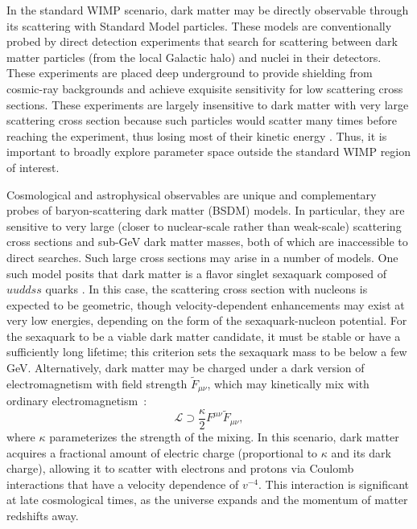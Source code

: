 In the standard WIMP scenario, dark matter may be directly observable through its scattering with Standard Model particles.
These models are conventionally probed by direct detection experiments that search for scattering between dark matter particles (from the local Galactic halo) and nuclei in their detectors.
These experiments are placed deep underground to provide shielding from cosmic-ray backgrounds and achieve exquisite sensitivity for low scattering cross sections. 
These experiments are largely insensitive to dark matter with very large scattering cross section because such particles would scatter many times before reaching the experiment, thus losing most of their kinetic energy \citep[\eg][]{Zaharijas:2004jv}.
Thus, it is important to broadly explore parameter space outside the standard WIMP region of interest.

Cosmological and astrophysical observables are unique and complementary probes of baryon-scattering dark matter (BSDM) models.
In particular, they are sensitive to very large (closer to nuclear-scale rather than weak-scale) scattering cross sections and sub-GeV dark matter masses, both of which are inaccessible to direct searches.
Such large cross sections may arise in a number of models.
One such model posits that dark matter is a flavor singlet sexaquark composed of $uuddss$ quarks \citep{Farrar:2017eqq}.
In this case, the scattering cross section with nucleons is expected to be geometric, though velocity-dependent enhancements may exist at very low energies, depending on the form of the sexaquark-nucleon potential.
For the sexaquark to be a viable dark matter candidate, it must be stable or have a sufficiently long lifetime; this criterion sets the sexaquark mass to be below a few GeV.
Alternatively, dark matter may be charged under a dark version of electromagnetism with field strength $\tilde{F}_{\mu\nu}$, which may kinetically mix with ordinary electromagnetism~\citep{Holdom:1985ag}:
\begin{equation}
    \mathcal{L} \supset \frac{\kappa}{2} F^{\mu\nu} \tilde{F}_{\mu\nu} ,
\end{equation}
where $\kappa$ parameterizes the strength of the mixing.
In this scenario, dark matter acquires a fractional amount of electric charge (proportional to $\kappa$ and its dark charge), allowing it to scatter with electrons and protons via Coulomb interactions that have a velocity dependence of $v^{-4}$.
This interaction is significant at late cosmological times, as the universe expands and the momentum of matter redshifts away.

